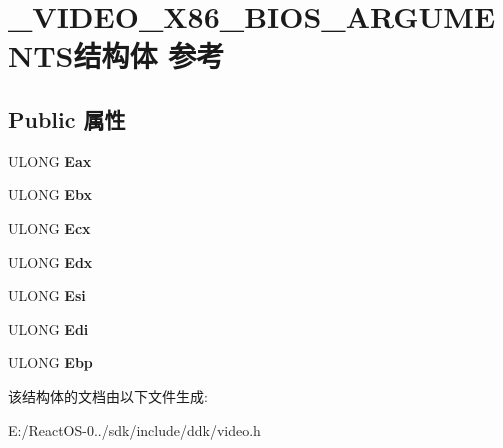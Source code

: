 \hypertarget{struct___v_i_d_e_o___x86___b_i_o_s___a_r_g_u_m_e_n_t_s}{}\section{\+\_\+\+V\+I\+D\+E\+O\+\_\+\+X86\+\_\+\+B\+I\+O\+S\+\_\+\+A\+R\+G\+U\+M\+E\+N\+T\+S结构体 参考}
\label{struct___v_i_d_e_o___x86___b_i_o_s___a_r_g_u_m_e_n_t_s}
\subsection*{Public 属性}
\begin{DoxyCompactItemize}
\item 
\mbox{\label{struct___v_i_d_e_o___x86___b_i_o_s___a_r_g_u_m_e_n_t_s_adfa264f62e482cc19dff84d987a57521}} 
U\+L\+O\+NG {\bfseries Eax}
\item 
\mbox{\label{struct___v_i_d_e_o___x86___b_i_o_s___a_r_g_u_m_e_n_t_s_a5bf6f6836c38d6da4a8c0e98c5dabbb1}} 
U\+L\+O\+NG {\bfseries Ebx}
\item 
\mbox{\label{struct___v_i_d_e_o___x86___b_i_o_s___a_r_g_u_m_e_n_t_s_a7c15d726568329a3fc68ed7c1c25037c}} 
U\+L\+O\+NG {\bfseries Ecx}
\item 
\mbox{\label{struct___v_i_d_e_o___x86___b_i_o_s___a_r_g_u_m_e_n_t_s_a4591ef6660c3b6b87502cc46b0626cdd}} 
U\+L\+O\+NG {\bfseries Edx}
\item 
\mbox{\label{struct___v_i_d_e_o___x86___b_i_o_s___a_r_g_u_m_e_n_t_s_a46a559d02a752a7d7ed2770e9c763ba2}} 
U\+L\+O\+NG {\bfseries Esi}
\item 
\mbox{\label{struct___v_i_d_e_o___x86___b_i_o_s___a_r_g_u_m_e_n_t_s_a2e936e041ff21229e539b16b5ad28823}} 
U\+L\+O\+NG {\bfseries Edi}
\item 
\mbox{\label{struct___v_i_d_e_o___x86___b_i_o_s___a_r_g_u_m_e_n_t_s_a11f19b02e2ffabf4ab1328262b1505ab}} 
U\+L\+O\+NG {\bfseries Ebp}
\end{DoxyCompactItemize}


该结构体的文档由以下文件生成\+:\begin{DoxyCompactItemize}
\item 
E\+:/\+React\+O\+S-\/0../sdk/include/ddk/video.\+h\end{DoxyCompactItemize}

